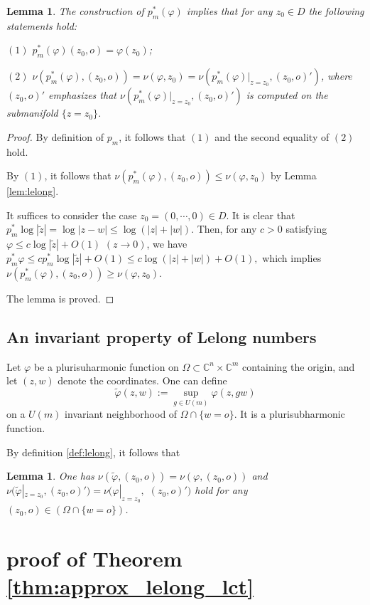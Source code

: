 \documentclass[reqno]{amsart}
\newtheorem{Lemma}[Theorem]{Lemma}
\numberwithin{equation}{section}
\begin{document}
\begin{Lemma}
\label{lem:property}
The construction of $p_{m}^{*}(\varphi)$ implies that for any $z_{0}\in D$ the following statements hold:

$(1)$ $p_{m}^{*}(\varphi)(z_{0},o)=\varphi(z_{0})$;

$(2)$ $\nu(p_{m}^{*}(\varphi),(z_{0},o))=\nu(\varphi,z_{0})=\nu(p_{m}^{*}(\varphi)|_{z=z_{0}},(z_{0},o)')$,
where $(z_{0},o)'$ emphasizes that $\nu(p_{m}^{*}(\varphi)|_{z=z_{0}},(z_{0},o)')$ is computed on the submanifold $\{z=z_{0}\}$.
\end{Lemma}

\begin{proof}
By definition of $p_{m}$,
it follows that $(1)$ and
the second equality of $(2)$ hold.

By $(1)$,
it follows that
$\nu(p_{m}^{*}(\varphi),(z_{0},o))\leq\nu(\varphi,z_{0})$ by Lemma \ref{lem:lelong}.

It suffices to consider the case $z_{0}=(0,\cdots,0)\in D$.
It is clear that
$p_{m}^{*}\log|\tilde{z}|=\log|z-w|\leq\log(|z|+|w|)$.
Then, for any $c>0$ satisfying
$\varphi\leq c\log|\tilde{z}|+O(1)$ $(z\to0)$,
we have
$p_{m}^{*}\varphi\leq c p_{m}^{*}\log|\tilde{z}|+O(1)\leq c\log(|z|+|w|)+O(1),$
which implies
$\nu(p_{m}^{*}(\varphi),(z_{0},o))\geq\nu(\varphi,z_{0})$.

The lemma is proved.
\end{proof}

\subsection{An invariant property of Lelong numbers}

Let $\varphi$ be a plurisuharmonic function on $\Omega\subset\mathbb{C}^{n}\times\mathbb{C}^{m}$ containing the origin,
and let $(z,w)$ denote the coordinates.
One can define
$$\tilde{\varphi}(z,w):=\sup_{g\in U(m)}\varphi(z,gw)$$
on a $U(m)$ invariant neighborhood of $\Omega\cap\{w=o\}$.
It is a plurisubharmonic function.

By definition \ref{def:lelong}, it follows that
\begin{Lemma}
\label{lem:invar}One has
$\nu(\tilde{\varphi},(z_{0},o))=\nu(\varphi,(z_{0},o))$
and
$\nu(\tilde{\varphi}|_{z=z_{0}},(z_{0},o)')=\nu(\varphi|_{z=z_{0}},$ $(z_{0},o)')$
hold for any $(z_{0},o)\in(\Omega\cap\{w=o\})$.
\end{Lemma}

\section{proof of Theorem \ref{thm:approx_lelong_lct}}
\end{document}
